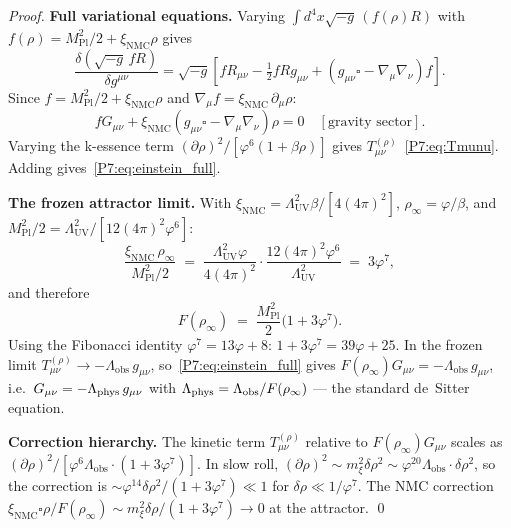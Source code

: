 \documentclass[11pt,a4paper]{article}
\theoremstyle{definition}
\theoremstyle{remark}
\newcommand{\vp}{\varphi}
\newcommand{\MPl}{M_{\mathrm{Pl}}}
\newcommand{\LUV}{\Lambda_{\mathrm{UV}}}
\newcommand{\Lobs}{\Lambda_{\mathrm{obs}}}
\newcommand{\rinfty}{\rho_{\infty}}
\newcommand{\xNMC}{\xi_{\mathrm{NMC}}}
\begin{document}
\begin{proof}
\textbf{Full variational equations.}
Varying $\int\!d^4x\sqrt{-g}\,(f(\rho)R)$ with $f(\rho)=\MPl^2/2+\xNMC\rho$
gives~\cite{Jacobson1995}
\begin{equation}
  \frac{\delta(\sqrt{-g}\,f R)}{\delta g^{\mu\nu}}
  = \sqrt{-g}\!\left[f R_{\mu\nu} - \tfrac{1}{2}f R g_{\mu\nu}
    + (g_{\mu\nu}\square - \nabla_\mu\nabla_\nu)f\right].
  \label{P7:eq:var_fR}
\end{equation}
Since $f = \MPl^2/2 + \xNMC\rho$ and $\nabla_\mu f = \xNMC\,\partial_\mu\rho$:
\begin{equation}
  f G_{\mu\nu} + \xNMC(g_{\mu\nu}\square - \nabla_\mu\nabla_\nu)\rho = 0
  \quad[\text{gravity sector}].
  \label{P7:eq:gravity_sector}
\end{equation}
Varying the k-essence term $(\partial\rho)^2/[\vp^6(1+\beta\rho)]$ gives
$T_{\mu\nu}^{(\rho)}$~\eqref{P7:eq:Tmunu}.
Adding gives~\eqref{P7:eq:einstein_full}.

\textbf{The frozen attractor limit.}
With $\xNMC = \LUV^2\beta/[4(4\pi)^2]$, $\rinfty=\vp/\beta$,
and $\MPl^2/2 = \LUV^2/[12(4\pi)^2\vp^6]$:
\begin{equation}
  \frac{\xNMC\,\rinfty}{\MPl^2/2}
  \;=\; \frac{\LUV^2\vp}{4(4\pi)^2}
    \cdot\frac{12(4\pi)^2\vp^6}{\LUV^2}
  \;=\; 3\vp^7,
  \label{P7:eq:NMC_ratio}
\end{equation}
and therefore
\begin{equation}
  F(\rinfty)
  \;=\; \frac{\MPl^2}{2}\bigl(1 + 3\vp^7\bigr).
  \label{P7:eq:Feff_derived}
\end{equation}
Using the Fibonacci identity $\vp^7 = 13\vp + 8$: $1+3\vp^7 = 39\vp+25$.
In the frozen limit $T_{\mu\nu}^{(\rho)}\to -\Lobs\,g_{\mu\nu}$,
so~\eqref{P7:eq:einstein_full} gives $F(\rinfty)G_{\mu\nu} = -\Lobs\,g_{\mu\nu}$,
i.e.\ $G_{\mu\nu} = -\Lambda_{\rm phys}\,g_{\mu\nu}$ with
$\Lambda_{\rm phys} = \Lobs/F(\rinfty)$ --- the standard de~Sitter equation.

\textbf{Correction hierarchy.}
The kinetic term $T_{\mu\nu}^{(\rho)}$ relative to $F(\rinfty)G_{\mu\nu}$
scales as $(\partial\rho)^2/[\vp^6\Lobs\cdot(1+3\vp^7)]$.
In slow roll, $(\partial\rho)^2\sim m_\xi^2\delta\rho^2\sim\vp^{20}\Lobs\cdot\delta\rho^2$,
so the correction is $\sim\vp^{14}\delta\rho^2/(1+3\vp^7)\ll1$
for $\delta\rho\ll1/\vp^7$.
The NMC correction $\xNMC\square\rho/F(\rinfty)\sim m_\xi^2\delta\rho/(1+3\vp^7)\to0$
at the attractor.
\qed
\end{proof}
\end{document}
